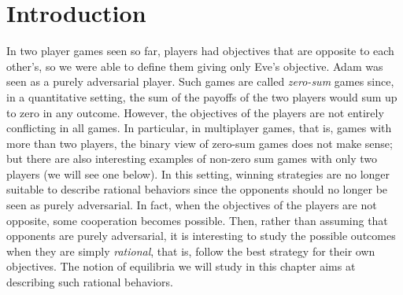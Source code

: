 \def\payoff{\ensuremath{f}}
\def\Act{A}
\def\Agt{\mathcal{P}}
\def\move{\textsf{move}}
\def\Out{\textsf{Out}}
\def\Dev{\textsf{Dev}}
\def\maxinf{\text{\rm maxinf}}
\def\pes{\textsf{pes}}
\def\opt{\textsf{opt}}
\def\proj{\textsf{proj}}
\def\devg{\textsf{DevGame}}

\section{Introduction}
\label{14-section:introduction}

In two player games seen so far, players had objectives that are
opposite to each other's, so we were able to define them giving only
Eve's objective. Adam was seen as a purely adversarial player. Such games
are called \emph{zero-sum} games since, in a quantitative setting, the
sum of the payoffs of the two players would sum up to zero in any
outcome. However, the objectives of the players are not entirely
conflicting in all games.
In particular, in multiplayer games, that is,
games with more than two players, the binary view of zero-sum games
does not make sense;
but there are also interesting examples of non-zero sum games with only two
players (we will see one below). In this setting, winning strategies are
no longer suitable to describe rational behaviors since the opponents
should no longer be seen as purely adversarial. In fact, when the
objectives of the players are not opposite, some cooperation becomes
possible. Then, rather than assuming that opponents are purely
adversarial, it is interesting to study the possible outcomes when they
are simply \emph{rational}, that is, follow the best strategy for their
own objectives. The notion of equilibria we will study in this chapter
aims at describing such rational behaviors.

